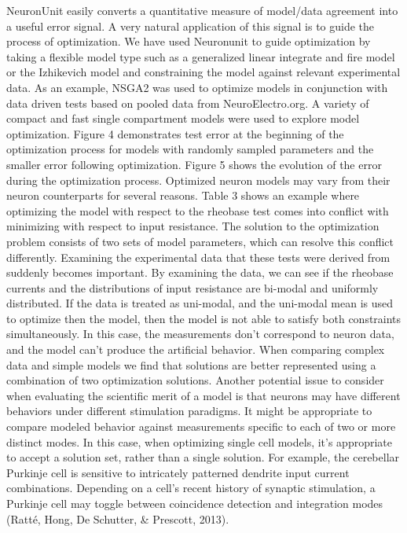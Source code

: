 \newline
NeuronUnit easily converts a quantitative measure of model/data agreement into a useful error signal. A very natural application of this signal is to guide the process of optimization. We have used Neuronunit to guide optimization by taking a flexible model type such as a generalized linear integrate and fire model or the Izhikevich model and constraining the model against relevant experimental data. As an example, NSGA2 was used to optimize models in conjunction with data driven tests based on pooled data from NeuroElectro.org. A variety of compact and fast single compartment models were used to explore model optimization. Figure 4 demonstrates test error at the beginning of the optimization process for models with randomly sampled parameters and the smaller error following optimization. Figure 5 shows the evolution of the error during the optimization process. \newline
\newline
Optimized neuron models may vary from their neuron counterparts for several reasons. Table 3 shows an example where optimizing the model with respect to the rheobase test comes into conflict with minimizing with respect to input resistance. The solution to the optimization problem consists of two sets of model parameters, which can resolve this conflict differently. Examining the experimental data that these tests were derived from suddenly becomes important. By examining the data, we can see if the rheobase currents and the distributions of input resistance are bi-modal and uniformly distributed. If the data is treated as uni-modal, and the uni-modal mean is used to optimize then the model, then the model is not able to satisfy both constraints simultaneously. In this case, the measurements don’t correspond to neuron data, and the model can’t produce the artificial behavior. When comparing complex data and simple models we find that solutions are better represented using a combination of two optimization solutions.\newline
\newline
Another potential issue to consider when evaluating the scientific merit of a model is that neurons may have different behaviors under different stimulation paradigms. It might be appropriate to compare modeled behavior against measurements specific to each of two or more distinct modes. In this case, when optimizing single cell models, it’s appropriate to accept a solution set, rather than a single solution. For example, the cerebellar Purkinje cell is sensitive to intricately patterned dendrite input current combinations. Depending on a cell’s recent history of synaptic stimulation, a Purkinje cell may toggle between coincidence detection and integration modes (Ratté, Hong, De Schutter, \& Prescott, 2013).\newline
